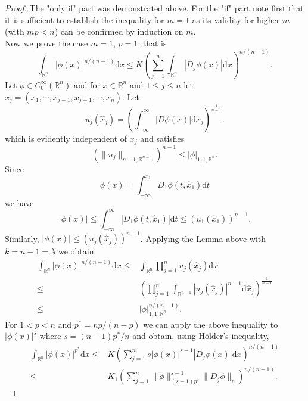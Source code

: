 \begin{proof}
  The "only if" part was demonstrated above. For the "if" part note first that it is sufficient to establish the inequality for  $m=1$ as its validity for higher $m$ (with $mp<n $) can be confirmed by induction on $m$. \\
  Now we prove the case  $m=1$, $p=1$, that is 
  \[
    \int_{\mathbb{R}^{n}}\left| \phi(x) \right| ^{n\slash(n-1)}\mathrm{d}x \le  K \left( \sum_{j=1}^{n}\int_{\mathbb{R}^{n}}\left| D_{j}\phi(x) \right| \mathrm{d}x \right) ^{n\slash(n-1)}
    .
  \] 
  Let $\phi \in C_0^{\infty}(\mathbb{R}^{n})$ and for $x\in \mathbb{R}^{n}$ and $1\le j\le n$ let $\hat{x}_{j}=\left( x_1,\cdots,x_{j-1},x_{j+1},\cdots,x_n \right) $. Let
  \[
    u_{j}(\hat{x}_j)=\left( \int_{-\infty}^{\infty}\left| D\phi(x) \right| \mathrm{d}x_j \right)^{\frac{1}{n-1}}
    .
  \]
which is evidently independent of $x_j$ and satisfies
\[
  \left( \|u_j\|_{n-1,\mathbb{R}^{n-1}} \right)^{n-1}\le \left| \phi \right| _{1,1,\mathbb{R}^{n}}
  .
\] 
Since 
\[
  \phi(x)=\int_{-\infty}^{x_1}D_1\phi(t,\hat{x}_1)\mathrm{d}t
\] 
we have 
\[
  \left| \phi(x) \right| \le \int_{-\infty}^{\infty}\left| D_1\phi(t,\hat{x}_1) \right| \mathrm{d}t\le \left( u_1\left( \hat{x}_1 \right)  \right)^{n-1}. 
\] 
Similarly, $\left| \phi(x) \right| \le \left( u_{j}\left( \hat{x}_j \right)  \right) ^{n-1}$. Applying the Lemma above with $k=n-1=\lambda$ we obtain
\begin{align*}
  \int_{\mathbb{R}^{n}}\left| \phi(x) \right| ^{n\slash(n-1)}\mathrm{d}x\le & \int_{\mathbb{R}^{n}}\prod_{j=1}^{n}u_{j}(\hat{x}_j)\mathrm{d}x\\
  \le & \left( \prod_{j=1}^{n}\int_{\mathbb{R}^{n-1}}\left| u_j(\hat{x}_j) \right| ^{n-1}\mathrm{d}\hat{x}_j \right) ^{\frac{1}{n-1}}\\
  \le &\left| \phi\right| _{1,1,\mathbb{R}^{n}}^{n\slash(n-1)}
.\end{align*}
  For $1<p<n$ and  $p^{\ast}=np\slash\left( n-p \right) $ we can apply the above inequality to $\left| \phi(x) \right| ^{s}$ where $s=(n-1)p^{\ast}\slash n$ and obtain, using H\"{o}lder's inequality,
  \begin{align*}
    \int_{\mathbb{R}^{n}}\left| \phi(x) \right| ^{p^{\ast}}\mathrm{d}x\le & K\left( \sum_{j=1}^{n}s\left| \phi(x) \right| ^{s-1}\left| D_{j}\phi(x) \right| \mathrm{d}x \right) ^{n\slash(n-1)}\\
    \le  & K_1 \left( \sum_{j=1}^{n}\|\phi\|^{s-1}_{(s-1)p'}\|D_{j}\phi\|_p \right) ^{n\slash(n-1)}
    .
  \end{align*}

\end{proof}
